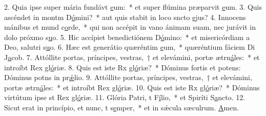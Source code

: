 2. Quia ipse super mária fundávt \uline{e}um:~* et super flúmina præparvit \uline{e}um.
3. Quis ascéndet in montm D\uline{ó}mini?~* aut quis stabit in loco sncto \uline{e}jus?
4. Innocens mánibus et mund c\uline{o}rde,~* qui non accépit in vano ánimam suam, nec jurávit in dolo próxmo s\uline{u}o.
5. Hic accípiet benedictiónem  D\uline{ó}mino:~* et misericórdiam a Deo, salutri s\uline{u}o.
6. Hæc est generátio quæréntim \uline{e}um,~* quæréntium fáciem Di J\uline{a}cob.
7. Attóllite portas, príncipes, vestras,~† et elevámini, portæ ætrn\uline{á}les:~* et introíbt Rex gl\uline{ó}riæ.
8. Quis est iste Rx gl\uline{ó}riæ?~* Dóminus fortis et potens: Dóminus potns in pr\uline{ǽ}lio.
9. Attóllite portas, príncipes, vestras,~† et elevámini, portæ ætrn\uline{á}les:~* et introíbt Rex gl\uline{ó}riæ.
10. Quis est iste Rx gl\uline{ó}riæ?~* Dóminus virtútum ipse st Rex gl\uline{ó}riæ.
11. Glória Patri, t F\uline{í}lio,~* et Spiríti S\uline{a}ncto.
12. Sicut erat in princípio, et nunc, t s\uline{e}mper,~* et in sǽcula sæculrum. \uline{A}men.
